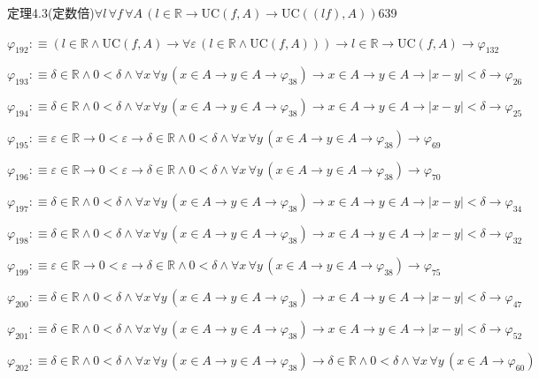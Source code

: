 \begin{fullproof}{定理4.3(定数倍)}{$\forall l\,\forall f\,\forall A\,(l \in \mathbb{R} \to \mathrm{UC}(f,A) \to \mathrm{UC}((l f),A))$}{639}
\begin{abbrevlist}
\item $\varphi_{192} :\equiv (l \in \mathbb{R} \land \mathrm{UC}(f,A) \to \forall \varepsilon\,(l \in \mathbb{R} \land \mathrm{UC}(f,A))) \to l \in \mathbb{R} \to \mathrm{UC}(f,A) \to \varphi_{132}$
\item $\varphi_{193} :\equiv \delta \in \mathbb{R} \land 0 < \delta \land \forall x\,\forall y\,(x \in A \to y \in A \to \varphi_{38}) \to x \in A \to y \in A \to \lvert x - y \rvert < \delta \to \varphi_{26}$
\item $\varphi_{194} :\equiv \delta \in \mathbb{R} \land 0 < \delta \land \forall x\,\forall y\,(x \in A \to y \in A \to \varphi_{38}) \to x \in A \to y \in A \to \lvert x - y \rvert < \delta \to \varphi_{25}$
\item $\varphi_{195} :\equiv \varepsilon \in \mathbb{R} \to 0 < \varepsilon \to \delta \in \mathbb{R} \land 0 < \delta \land \forall x\,\forall y\,(x \in A \to y \in A \to \varphi_{38}) \to \varphi_{69}$
\item $\varphi_{196} :\equiv \varepsilon \in \mathbb{R} \to 0 < \varepsilon \to \delta \in \mathbb{R} \land 0 < \delta \land \forall x\,\forall y\,(x \in A \to y \in A \to \varphi_{38}) \to \varphi_{70}$
\item $\varphi_{197} :\equiv \delta \in \mathbb{R} \land 0 < \delta \land \forall x\,\forall y\,(x \in A \to y \in A \to \varphi_{38}) \to x \in A \to y \in A \to \lvert x - y \rvert < \delta \to \varphi_{34}$
\item $\varphi_{198} :\equiv \delta \in \mathbb{R} \land 0 < \delta \land \forall x\,\forall y\,(x \in A \to y \in A \to \varphi_{38}) \to x \in A \to y \in A \to \lvert x - y \rvert < \delta \to \varphi_{32}$
\item $\varphi_{199} :\equiv \varepsilon \in \mathbb{R} \to 0 < \varepsilon \to \delta \in \mathbb{R} \land 0 < \delta \land \forall x\,\forall y\,(x \in A \to y \in A \to \varphi_{38}) \to \varphi_{75}$
\item $\varphi_{200} :\equiv \delta \in \mathbb{R} \land 0 < \delta \land \forall x\,\forall y\,(x \in A \to y \in A \to \varphi_{38}) \to x \in A \to y \in A \to \lvert x - y \rvert < \delta \to \varphi_{47}$
\item $\varphi_{201} :\equiv \delta \in \mathbb{R} \land 0 < \delta \land \forall x\,\forall y\,(x \in A \to y \in A \to \varphi_{38}) \to x \in A \to y \in A \to \lvert x - y \rvert < \delta \to \varphi_{52}$
\item $\varphi_{202} :\equiv \delta \in \mathbb{R} \land 0 < \delta \land \forall x\,\forall y\,(x \in A \to y \in A \to \varphi_{38}) \to \delta \in \mathbb{R} \land 0 < \delta \land \forall x\,\forall y\,(x \in A \to \varphi_{60})$

\end{abbrevlist}
\end{fullproof}
